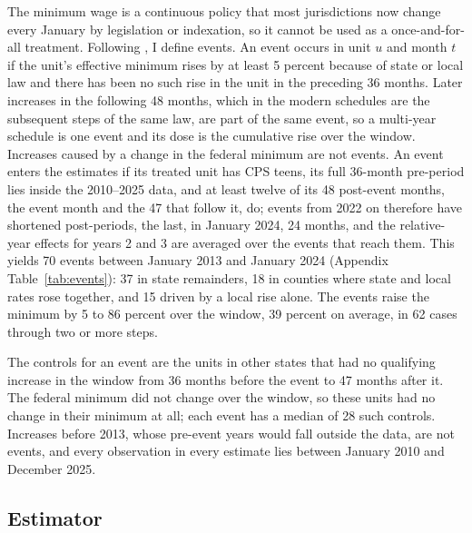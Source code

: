 \documentclass[12pt]{article}
\begin{document}
The minimum wage is a continuous policy that most jurisdictions now change every January by legislation or indexation, so it cannot be used as a once-and-for-all treatment. Following \citet{cengiz2019}, I define events. An event occurs in unit $u$ and month $t$ if the unit's effective minimum rises by at least 5 percent because of state or local law and there has been no such rise in the unit in the preceding 36 months. Later increases in the following 48 months, which in the modern schedules are the subsequent steps of the same law, are part of the same event, so a multi-year schedule is one event and its dose is the cumulative rise over the window. Increases caused by a change in the federal minimum are not events. An event enters the estimates if its treated unit has CPS teens, its full 36-month pre-period lies inside the 2010--2025 data, and at least twelve of its 48 post-event months, the event month and the 47 that follow it, do; events from 2022 on therefore have shortened post-periods, the last, in January 2024, 24 months, and the relative-year effects for years 2 and 3 are averaged over the events that reach them. This yields 70 events between January 2013 and January 2024 (Appendix Table~\ref{tab:events}): 37 in state remainders, 18 in counties where state and local rates rose together, and 15 driven by a local rise alone. The events raise the minimum by 5 to 86 percent over the window, 39 percent on average, in 62 cases through two or more steps.

The controls for an event are the units in other states that had no qualifying increase in the window from 36 months before the event to 47 months after it. The federal minimum did not change over the window, so these units had no change in their minimum at all; each event has a median of 28 such controls. Increases before 2013, whose pre-event years would fall outside the data, are not events, and every observation in every estimate lies between January 2010 and December 2025.

\subsection{Estimator}
\end{document}
